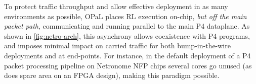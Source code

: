 \documentclass[
conference
,10pt
]{IEEEtran}
\newcommand{\approachshort}{OPaL}
\begin{document}

To protect traffic throughput and allow effective deployment in as many environments as possible, \approachshort{} places RL execution on-chip, \emph{but off the main packet path}, communicating and running parallel to the main P4 dataplane.
As shown in \cref{fig:netro-arch}, this asynchrony allows coexistence with P4 programs, and imposes minimal impact on carried traffic for both bump-in-the-wire deployments and at end-points.
For instance, in the default deployment of a P4 packet processing pipeline on Netronome NFP chips several cores go unused (as does spare area on an FPGA design), making this paradigm possible.

%
\end{document}
